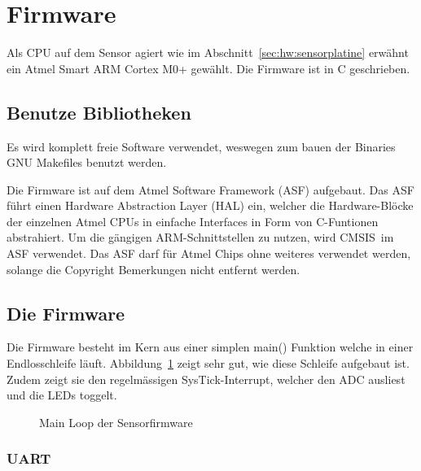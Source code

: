 \section{Firmware \Sensor}
\label{sec:firmware:sensor}

Als  CPU auf  dem  Sensor agiert  wie im  Abschnitt~\ref{sec:hw:sensorplatine}
erw\"ahnt ein  Atmel Smart ARM  Cortex M0+ gew\"ahlt.   Die Firmware ist  in C
geschrieben.

\subsection{Benutze Bibliotheken}

Es wird komplett freie Software verwendet, weswegen zum bauen der Binaries GNU
Makefiles benutzt werden.

Die  Firmware  ist  auf  dem Atmel  Software  Framework  (ASF)  aufgebaut. Das
ASF  f\"uhrt  einen   Hardware  Abstraction  Layer  (HAL)   ein,  welcher  die
Hardware-Bl\"ocke der einzelnen Atmel CPUs  in einfache Interfaces in Form von
C-Funtionen abstrahiert. Um die g\"angigen  ARM-Schnittstellen zu nutzen, wird
CMSIS im  ASF  verwendet. Das  ASF  darf  f\"ur  Atmel  Chips  ohne  weiteres
verwendet werden, solange die Copyright Bemerkungen nicht entfernt werden.

\subsection{Die Firmware}

Die Firmware besteht im Kern aus einer simplen main() Funktion welche in einer
Endlosschleife l\"auft. Abbildung~\ref{fig:sensor:firmware:mainloop} zeigt sehr gut, wie diese Schleife aufgebaut ist.
Zudem zeigt sie den regelmässigen SysTick-Interrupt, welcher den ADC ausliest und die LEDs toggelt.

\begin{figure}[h!tb]

\caption{Main Loop der Sensorfirmware}
\label{fig:sensor:firmware:mainloop}
\end{figure}

\subsubsection{UART}
\label{subs:UART}

